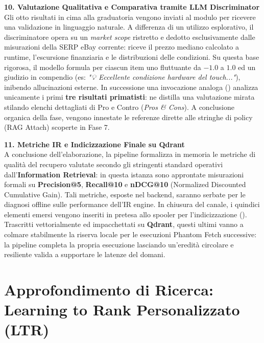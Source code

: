 \vspace{0.4cm}
\noindent
\textbf{10. Valutazione Qualitativa e Comparativa tramite LLM Discriminator}\\
Gli otto risultati in cima alla graduatoria vengono inviati al
modulo  per ricevere una
validazione in linguaggio naturale. A differenza di
un utilizzo esplorativo, il discriminatore opera su un \textit{market scope}
ristretto e dedotto esclusivamente dalle misurazioni della SERP eBay corrente:
riceve il prezzo mediano calcolato a runtime, l'escursione finanziaria e le distribuzioni delle condizioni.
Su questa base rigorosa, il modello formula per ciascun item uno  fluttuante da \(-1.0\) a \(1.0\) 
ed un giudizio in compendio (es: \emph{"💡 Eccellente condizione hardware del touch..."}), inibendo allucinazioni esterne.
In successione una invocazione analoga ()
analizza unicamente i primi \textbf{tre risultati primatisti}: ne distilla una valutazione 
mirata stilando elenchi dettagliati di Pro e Contro (\emph{Pros \& Cons}). 
A conclusione organica della fase, vengono innestate le referenze dirette alle stringhe di policy (RAG Attach) scoperte in Fase 7.

\vspace{0.4cm}
\noindent
\textbf{11. Metriche IR e Indicizzazione Finale su Qdrant}\\
A conclusione dell'elaborazione, la pipeline formalizza in memoria
le metriche di qualità del recupero valutate secondo gli stringenti standard operativi
dall'\textbf{Information Retrieval}: in questa istanza sono approntate misurazioni formali su
\textbf{Precision@5}, \textbf{Recall@10} e \textbf{nDCG@10} (Normalized Discounted Cumulative Gain).
Tali metriche, esposte nel backend, saranno serbate per le diagnosi offline sulle performance dell'IR engine.
In chiusura del canale, i quindici elementi emersi vengono inseriti in pretesa allo spooler per l'indicizzazione ().
Trascritti vettorialmente ed impacchettati su \textbf{Qdrant}, questi ultimi vanno a colmare stabilmente 
la riserva locale per le esecuzioni Phantom Fetch successive: la pipeline completa la propria esecuzione 
lasciando un'eredità circolare e resiliente valida a supportare le latenze del domani.

\vspace{1cm}
\section{Approfondimento di Ricerca: Learning to Rank Personalizzato (LTR)}

